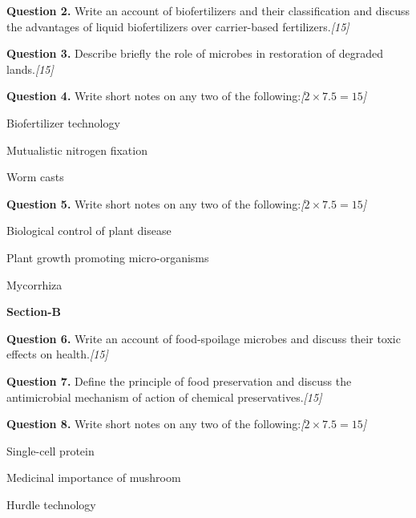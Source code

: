 \documentclass[11pt,a4paper]{article}
\newcommand{\pts}[1]{\hfill   \textit{[#1]}}
\begin{document}
\medskip


\noindent   \textbf{Question 2.} Write an account of biofertilizers and their classification and discuss the advantages of liquid biofertilizers over carrier-based fertilizers.\pts{15}

\medskip


\noindent   \textbf{Question 3.} Describe briefly the role of microbes in restoration of degraded lands.\pts{15}

\medskip


\noindent   \textbf{Question 4.} Write short notes on any two of the following:\pts{$2  \times 7.5 = 15$}

\begin{parts}
  \item Biofertilizer technology
  \item Mutualistic nitrogen fixation
  \item Worm casts
\end{parts}

\medskip


\noindent   \textbf{Question 5.} Write short notes on any two of the following:\pts{$2  \times 7.5 = 15$}

\begin{parts}
  \item Biological control of plant disease
  \item Plant growth promoting micro-organisms
  \item Mycorrhiza
\end{parts}

\bigskip

\begin{center}
   \textbf{Section-B}
\end{center}
\medskip

\medskip


\noindent   \textbf{Question 6.} Write an account of food-spoilage microbes and discuss their toxic effects on health.\pts{15}

\medskip


\noindent   \textbf{Question 7.} Define the principle of food preservation and discuss the antimicrobial mechanism of action of chemical preservatives.\pts{15}

\medskip


\noindent   \textbf{Question 8.} Write short notes on any two of the following:\pts{$2  \times 7.5 = 15$}

\begin{parts}
  \item Single-cell protein
  \item Medicinal importance of mushroom
  \item Hurdle technology
\end{parts}
\end{document}
